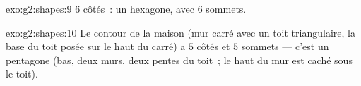 \begin{solution}{exo:g2:shapes:9}
$6$ côtés~: un hexagone, avec $6$ sommets.
\end{solution}

\begin{solution}{exo:g2:shapes:10}
Le contour de la maison (mur carré avec un toit triangulaire, la
base du toit posée sur le haut du carré) a $5$ côtés et $5$
sommets --- c'est un pentagone (bas, deux murs, deux pentes du toit~;
le haut du mur est caché sous le toit).
\end{solution}
